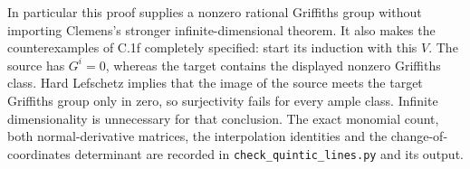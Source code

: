 In particular this proof supplies a nonzero rational Griffiths group
without importing Clemens's stronger infinite-dimensional theorem.
It also makes the counterexamples of C.1f completely specified:
start its induction with this $V$. The source has $G^i=0$, whereas
the target contains the displayed nonzero Griffiths class. Hard
Lefschetz implies that the image of the source meets the target
Griffiths group only in zero, so surjectivity fails for every ample
class. Infinite dimensionality is unnecessary for that conclusion.
The exact monomial count, both normal-derivative matrices, the
interpolation identities and the change-of-coordinates determinant
are recorded in \texttt{check\_quintic\_lines.py} and its output.
